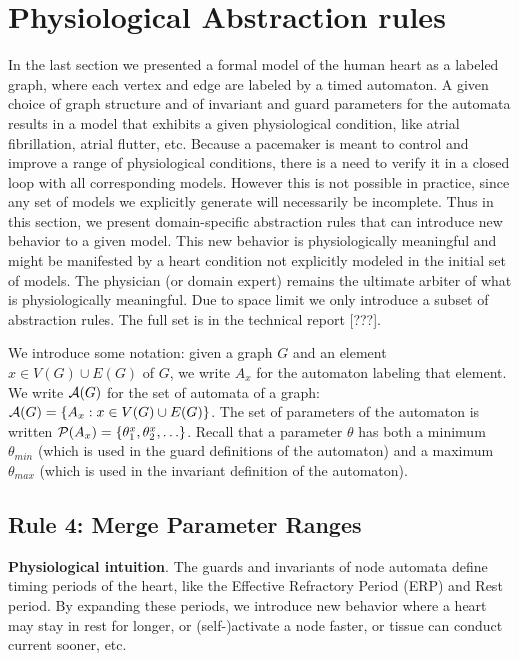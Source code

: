 \section{Physiological Abstraction rules}
\label{abstractionRules}
In the last section we presented a formal model of the human heart as a labeled graph, where each vertex and edge are labeled by a timed automaton.
A given choice of graph structure and of invariant and guard parameters for the automata results in a model that exhibits a given physiological condition, like atrial fibrillation, atrial flutter, etc.
Because a pacemaker is meant to control and improve a range of physiological conditions, there is a need to verify it in a closed loop with all corresponding models.
However this is not possible in practice, since any set of models we explicitly generate will necessarily be incomplete. 
Thus in this section, we present domain-specific abstraction rules that can introduce new behavior to a given model. 
This new behavior is physiologically meaningful and might be manifested by a heart condition not explicitly modeled in the initial set of models.
The physician (or domain expert) remains the ultimate arbiter of what is physiologically meaningful.
Due to space limit we only introduce a subset of abstraction rules. 
The full set is in the technical report [???].

We introduce some notation: given a graph $G$ and an element $x \in V(G) \cup E(G)$ of $G$, we write $A_x$ for the automaton labeling that element.
We write $\mathcal{A}(G)$ for the set of automata of a graph: $\mathcal{A}(G) = \{A_x : x \in V(G) \cup E(G)\}$.
The set of parameters of the automaton is written $\mathcal{P}(A_x) = \{\theta_1^x,\theta_2^x,\ldots\}$. 
Recall that a parameter $\theta$ has both a minimum $\theta_{min}$ (which is used in the guard definitions of the automaton) and a maximum $\theta_{max}$ (which is used in the invariant definition of the automaton).

%
%

\subsection{Rule 4: Merge Parameter Ranges}
\textbf{Physiological intuition}. 
The guards and invariants of node automata define timing periods of the heart, like the Effective Refractory Period (ERP) and Rest period. 
By expanding these periods, we introduce new behavior where a heart may stay in rest for longer, or (self-)activate a node faster, or tissue can conduct current sooner, etc.


